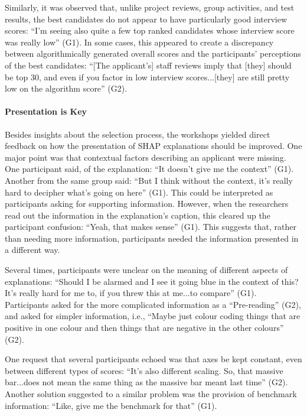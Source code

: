 Similarly, it was observed that, unlike project reviews, group activities, and test results, the best candidates do not appear to have particularly good interview scores: ``I'm seeing also quite a few top ranked candidates whose interview score was really low'' (G1). In some cases, this appeared to create a discrepancy between algorithmically generated overall scores and the participants' perceptions of the best candidates: ``[The applicant's] staff reviews imply that [they] should be top 30, and even if you factor in low interview scores...[they] are still pretty low on the algorithm score'' (G2).

\paragraph{Presentation is Key}
Besides insights about the selection process, the workshops yielded direct feedback on how the presentation of SHAP explanations should be improved. One major point was that contextual factors describing an applicant were missing. One participant said, of the explanation: ``It doesn't give me the context'' (G1). Another from the same group said: ``But I think without the context, it's really hard to decipher what's going on here'' (G1). This could be interpreted as participants asking for supporting information. However, when the researchers read out the information in the explanation's caption, this cleared up the participant confusion: ``Yeah, that makes sense'' (G1). This suggests that, rather than needing more information, participants needed the information presented in a different way.

Several times, participants were unclear on the meaning of different aspects of explanations: ``Should I be alarmed and I see it going blue in the context of this? It's really hard for me to, if you threw this at me...to compare'' (G1). Participants asked for the more complicated information as a ``Pre-reading'' (G2), and asked for simpler information, i.e., ``Maybe just colour coding things that are positive in one colour and then things that are negative in the other colours'' (G2).

One request that several participants echoed was that axes be kept constant, even between different types of scores: ``It's also different scaling. So, that massive bar...does not mean the same thing as the massive bar meant last time'' (G2). Another solution suggested to a similar problem was the provision of benchmark information: ``Like, give me the benchmark for that'' (G1).

